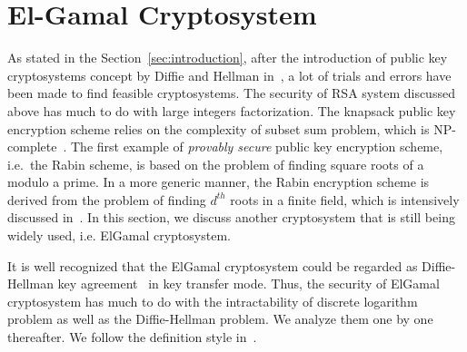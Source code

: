 \documentclass[12pt,journal,compsoc]{IEEEtran}
\begin{document}
\section{El-Gamal Cryptosystem}
\label{sec:el-gamal-crypt}
As stated in the Section~\ref{sec:introduction}, after the
introduction of public key cryptosystems concept by Diffie and Hellman
in~\cite{ref:Diffie1976}, a lot of trials and errors have been made to
find feasible cryptosystems. The security of RSA system discussed
above has much to do with large integers factorization. The knapsack
public key encryption scheme relies on the complexity of subset sum
problem, which is NP-complete~\cite{ref:Odlyzko1990}. The first
example of \emph{provably secure} public key encryption scheme,
i.e.\ the Rabin scheme, is based on the problem of finding square
roots of a modulo a prime. In a more generic manner, the Rabin
encryption scheme is derived from the problem of finding $d^{th}$
roots in a finite field, which is intensively discussed
in~\cite{ref:Bach1996}. In this section, we discuss another cryptosystem that
is still being widely used, i.e. ElGamal cryptosystem. 
\par
It is well recognized that the ElGamal cryptosystem could be regarded as
Diffie-Hellman key agreement~\cite{ref:Elgamal1985} in key transfer
mode. Thus, the security of ElGamal cryptosystem has much to do with
the intractability of discrete logarithm problem as well as the
Diffie-Hellman problem. We analyze them one by one thereafter. We
follow the definition style in~\cite{ref:menezes2010handbook}.
\end{document}
